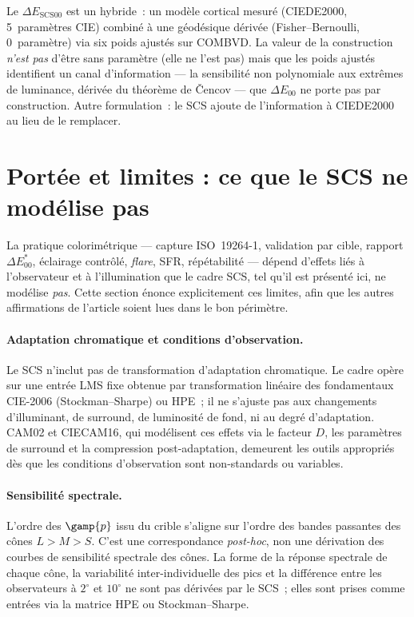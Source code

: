 \documentclass[12pt,a4paper]{article}
\begin{document}
Le $\Delta E_{\mathrm{SCS00}}$ est un hybride~: un mod\`ele cortical
mesur\'e (CIEDE2000, 5~param\`etres CIE) combin\'e \`a une
g\'eod\'esique d\'eriv\'ee (Fisher--Bernoulli, 0~param\`etre) via six
poids ajust\'es sur COMBVD. La valeur de la construction \emph{n'est
pas} d'\^etre sans param\`etre (elle ne l'est pas) mais que les poids
ajust\'es identifient un canal d'information --- la sensibilit\'e non
polynomiale aux extr\^emes de luminance, d\'eriv\'ee du th\'eor\`eme
de \v{C}encov --- que $\Delta E_{00}$ ne porte pas par construction.
Autre formulation~: le SCS ajoute de l'information \`a CIEDE2000 au
lieu de le remplacer.

\section{Port\'ee et limites : ce que le SCS ne mod\'elise pas}
\label{sec:scope_limits}

La pratique colorim\'etrique --- capture ISO~19264-1, validation par
cible, rapport $\Delta E^*_{00}$, \'eclairage contr\^ol\'e,
\emph{flare}, SFR, r\'ep\'etabilit\'e --- d\'epend d'effets li\'es \`a
l'observateur et \`a l'illumination que le cadre SCS, tel qu'il est
pr\'esent\'e ici, ne mod\'elise \emph{pas}. Cette section \'enonce
explicitement ces limites, afin que les autres affirmations de
l'article soient lues dans le bon p\'erim\`etre.

\paragraph{Adaptation chromatique et conditions d'observation.}
Le SCS n'inclut pas de transformation d'adaptation chromatique. Le
cadre op\`ere sur une entr\'ee LMS fixe obtenue par transformation
lin\'eaire des fondamentaux CIE-2006 (Stockman--Sharpe) ou HPE~; il
ne s'ajuste pas aux changements d'illuminant, de surround, de
luminosit\'e de fond, ni au degr\'e d'adaptation. CAM02 et CIECAM16,
qui mod\'elisent ces effets via le facteur $D$, les param\`etres de
surround et la compression post-adaptation, demeurent les outils
appropri\'es d\`es que les conditions d'observation sont
non-standards ou variables.

\paragraph{Sensibilit\'e spectrale.}
L'ordre des $\gamp{p}$ issu du crible s'aligne sur l'ordre des
bandes passantes des c\^ones $L > M > S$. C'est une correspondance
\emph{post-hoc}, non une d\'erivation des courbes de sensibilit\'e
spectrale des c\^ones. La forme de la r\'eponse spectrale de chaque
c\^one, la variabilit\'e inter-individuelle des pics et la
diff\'erence entre les observateurs \`a $2^\circ$ et $10^\circ$ ne
sont pas d\'eriv\'ees par le SCS~; elles sont prises comme entr\'ees
via la matrice HPE ou Stockman--Sharpe.
\end{document}
